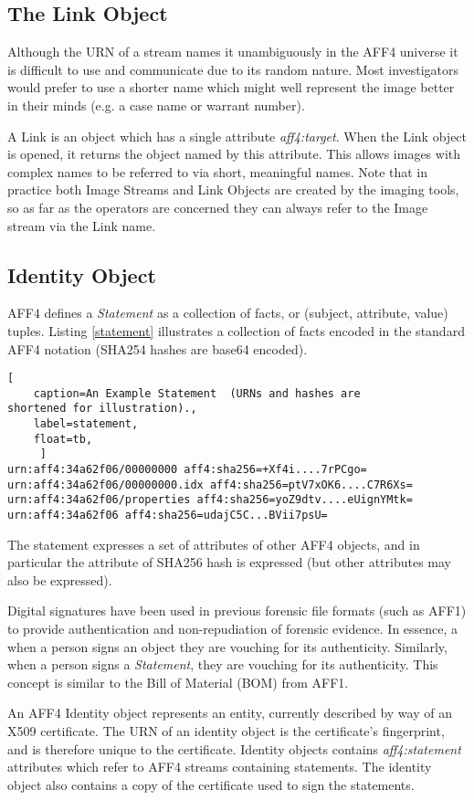 \documentclass[10pt, conference]{IEEEtran}
\begin{document}
\subsection{The Link Object}
Although the URN of a stream names it unambiguously in the AFF4
universe it is difficult to use and communicate due to its random
nature. Most investigators would prefer to use a shorter name which
might well represent the image better in their minds (e.g. a case
name or warrant number).

A Link is an object which has a single attribute
\emph{aff4:target}. When the Link object is opened, it returns the
object named by this attribute. This allows images with complex names
to be referred to via short, meaningful names. Note that in practice
both Image Streams and Link Objects are created by the imaging tools,
so as far as the operators are concerned they can always refer to the
Image stream via the Link name.

\subsection{Identity Object}
AFF4 defines a \emph{Statement} as a collection of facts, or
(subject, attribute, value) tuples. Listing \ref{statement}
illustrates a collection of facts encoded in the standard AFF4
notation (SHA254 hashes are base64 encoded).

\begin{lstlisting}[
	caption=An Example Statement  (URNs and hashes are
shortened for illustration).,
	label=statement,
	float=tb,
	 ]
urn:aff4:34a62f06/00000000 aff4:sha256=+Xf4i....7rPCgo=
urn:aff4:34a62f06/00000000.idx aff4:sha256=ptV7xOK6....C7R6Xs=
urn:aff4:34a62f06/properties aff4:sha256=yoZ9dtv....eUignYMtk=
urn:aff4:34a62f06 aff4:sha256=udajC5C...BVii7psU=
\end{lstlisting}

The statement expresses a set of attributes of other AFF4 objects, and
in particular the attribute of SHA256 hash is expressed (but other
attributes may also be expressed).

Digital signatures have been used in previous forensic file formats
(such as AFF1) to provide authentication and non-repudiation of
forensic evidence. In essence, a when a person signs an object they
are vouching for its authenticity. Similarly, when a person signs a
\emph{Statement}, they are vouching for its authenticity. This concept
is similar to the Bill of Material (BOM) from AFF1.

An AFF4 Identity object represents an entity, currently described by
way of an X509 certificate. The URN of an identity object is the
certificate's fingerprint, and is therefore unique to the
certificate. Identity objects contains \emph{aff4:statement}
attributes which refer to AFF4 streams containing statements. The
identity object also contains a copy of the certificate used to sign
the statements.
\end{document}
